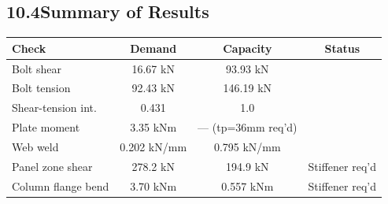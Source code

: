\documentclass[12pt,a4paper]{article}
\begin{document}
\subsection{10.4\quad Summary of Results}

\begin{center}
\begin{tabular}{@{}lccc@{}}
\toprule
\rowcolor{headgray}
\textbf{Check} & \textbf{Demand} & \textbf{Capacity} & \textbf{Status}\\
\midrule
Bolt shear          & 16.67 kN  & 93.93 kN  & \\
\rowcolor{rowlight}
Bolt tension        & 92.43 kN  & 146.19 kN & \\
Shear-tension int.  & 0.431     & 1.0       & \\
\rowcolor{rowlight}
Plate moment        & 3.35 kNm  & — (tp=36mm req'd) \\
Web weld            & 0.202 kN/mm & 0.795 kN/mm \\
\rowcolor{rowlight}
Panel zone shear    & 278.2 kN  & 194.9 kN  & Stiffener req'd \\
Column flange bend  & 3.70 kNm  & 0.557 kNm & Stiffener req'd \\
\bottomrule
\end{tabular}
\end{center}
\end{document}
